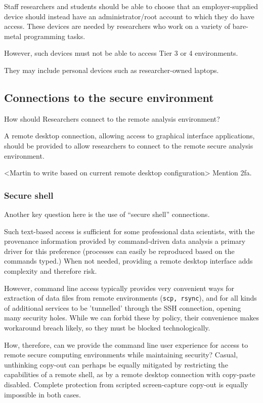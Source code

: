 \documentclass[10pt,a4paper,twocolumn]{article}
\begin{document}
Staff researchers and students should be able to choose that an employer-supplied device should instead have an administrator/root account to which they do have access.
These devices are needed by researchers who work on a variety of bare-metal programming tasks.

However, such devices must not be able to access Tier 3 or 4 environments.

They may include personal devices such as researcher-owned laptops.

\subsection{Connections to the secure environment}

How should Researchers connect to the remote analysis environment?

A remote desktop connection, allowing access to graphical interface applications, should be provided to allow researchers to connect to the remote secure analysis environment. 


<Martin to write based on current remote desktop configuration>
Mention 2fa.

\subsubsection{Secure shell}

Another key question here is the use of ``secure shell'' connections.

Such text-based access is sufficient for some professional data scientists, with the provenance
information provided by command-driven data analysis a primary driver for this preference (processes can 
easily be reproduced based on the commands typed.) 
When not needed, providing a remote desktop interface adds complexity and therefore risk.

However, command line access typically provides very convenient ways for extraction of data files from remote environments (\verb|scp, rsync|), and for all kinds of additional services to be 'tunnelled' through the SSH connection, opening many security holes. While we can forbid these by policy, their convenience makes workaround breach likely, so they must be blocked technologically.

How, therefore, can we provide the command line user experience for access to remote secure computing environments while maintaining security? Casual, unthinking copy-out can perhaps be equally mitigated by restricting the capabilities of a remote shell, as by a remote desktop connection with copy-paste disabled. Complete protection from scripted screen-capture copy-out is equally impossible in both cases. 
\end{document}
